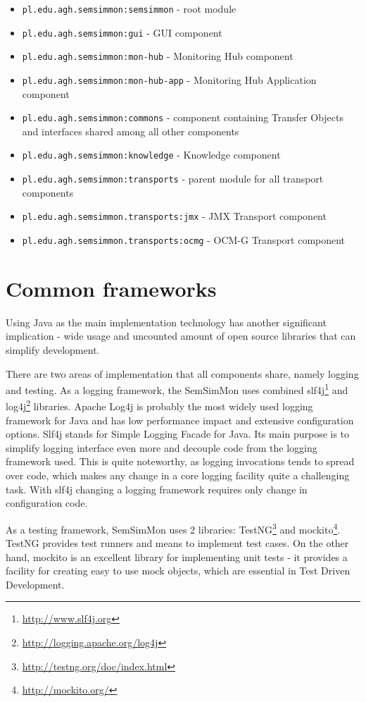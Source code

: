 \begin{itemize}
\item \texttt{pl.edu.agh.semsimmon:semsimmon} - root module
\item \texttt{pl.edu.agh.semsimmon:gui} - GUI component
\item \texttt{pl.edu.agh.semsimmon:mon-hub} - Monitoring Hub component
\item \texttt{pl.edu.agh.semsimmon:mon-hub-app} - Monitoring Hub Application component 
\item \texttt{pl.edu.agh.semsimmon:commons} - component containing Transfer Objects and interfaces shared among all other components
\item \texttt{pl.edu.agh.semsimmon:knowledge} - Knowledge component
\item \texttt{pl.edu.agh.semsimmon:transports} - parent module for all transport components
\item \texttt{pl.edu.agh.semsimmon.transports:jmx} - JMX Transport component
\item \texttt{pl.edu.agh.semsimmon.transports:ocmg} - OCM-G Transport component
\end{itemize}

\section{Common frameworks}

Using Java as the main implementation technology has another significant implication - wide usage and uncounted amount of open source libraries that can simplify development.

There are two areas of implementation that all components share, namely logging and testing. As a logging framework, the SemSimMon uses combined slf4j\footnote{\url{http://www.slf4j.org}} and log4j\footnote{\url{http://logging.apache.org/log4j}} libraries. Apache Log4j is probably the most widely used logging framework for Java and has low performance impact and extensive configuration options. Slf4j stands for Simple Logging Facade for Java. Its main purpose is to simplify logging interface even more and decouple code from the logging framework used. This is quite noteworthy, as logging invocations tends to spread over code, which makes any change in a core logging facility quite a challenging task. With slf4j changing a logging framework requires only change in configuration code.

As a testing framework, SemSimMon uses 2 libraries: TestNG\footnote{\url{http://testng.org/doc/index.html}} and mockito\footnote{\url{http://mockito.org/}}. TestNG provides test runners and means to implement test cases. On the other hand, mockito is an excellent library for implementing unit tests - it provides a facility for creating easy to use mock objects, which are essential in Test Driven Development.





